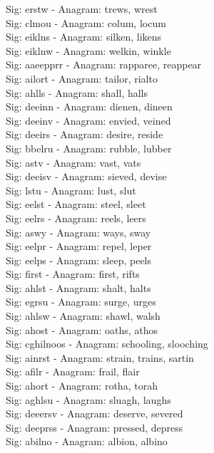 Sig: {erstw} - Anagram: trews, wrest \\
Sig: {clmou} - Anagram: colum, locum \\
Sig: {eiklns} - Anagram: silken, likens \\
Sig: {eiklnw} - Anagram: welkin, winkle \\
Sig: {aaeepprr} - Anagram: rapparee, reappear \\
Sig: {ailort} - Anagram: tailor, rialto \\
Sig: {ahlls} - Anagram: shall, halls \\
Sig: {deeinn} - Anagram: dienen, dineen \\
Sig: {deeinv} - Anagram: envied, veined \\
Sig: {deeirs} - Anagram: desire, reside \\
Sig: {bbelru} - Anagram: rubble, lubber \\
Sig: {astv} - Anagram: vast, vats \\
Sig: {deeisv} - Anagram: sieved, devise \\
Sig: {lstu} - Anagram: lust, slut \\
Sig: {eelst} - Anagram: steel, sleet \\
Sig: {eelrs} - Anagram: reels, leers \\
Sig: {aswy} - Anagram: ways, sway \\
Sig: {eelpr} - Anagram: repel, leper \\
Sig: {eelps} - Anagram: sleep, peels \\
Sig: {first} - Anagram: first, rifts \\
Sig: {ahlst} - Anagram: shalt, halts \\
Sig: {egrsu} - Anagram: surge, urges \\
Sig: {ahlsw} - Anagram: shawl, walsh \\
Sig: {ahost} - Anagram: oaths, athos \\
Sig: {cghilnoos} - Anagram: schooling, slooching \\
Sig: {ainrst} - Anagram: strain, trains, sartin \\
Sig: {afilr} - Anagram: frail, flair \\
Sig: {ahort} - Anagram: rotha, torah \\
Sig: {aghlsu} - Anagram: sluagh, laughs \\
Sig: {deeersv} - Anagram: deserve, severed \\
Sig: {deeprss} - Anagram: pressed, depress \\
Sig: {abilno} - Anagram: albion, albino \\
